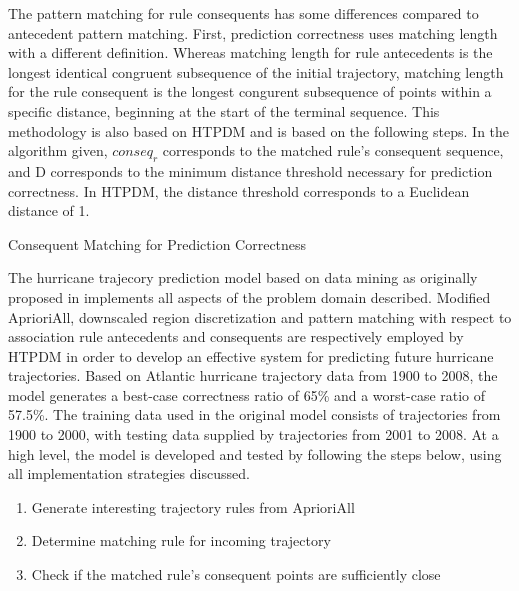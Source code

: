 \documentclass[12pt,conference]{IEEEtran}
\begin{document}
The pattern matching for rule consequents has some differences compared to antecedent pattern matching. First, prediction correctness uses matching length with a different definition. Whereas matching length for rule antecedents is the longest identical congruent subsequence of the initial trajectory, matching length for the rule consequent is the longest congurent subsequence of points within a specific distance, beginning at the start of the terminal sequence. This methodology is also based on HTPDM and is based on the following steps. In the algorithm given, $conseq_{r}$ corresponds to the matched rule's consequent sequence, and D corresponds to the minimum distance threshold necessary for prediction correctness. In HTPDM, the distance threshold corresponds to a Euclidean distance of 1.

\begin{algorithm}[H]
  \caption{Consequent Matching for Prediction Correctness}
  \label{consequent_matching}
  \begin{algorithmic}[1]
  \EndIf
  \end{algorithmic}
\end{algorithm}

The hurricane trajecory prediction model based on data mining as originally proposed in \cite{major-hurricane-model} implements all aspects of the problem domain described. Modified AprioriAll, downscaled region discretization and pattern matching with respect to association rule antecedents and consequents are respectively employed by HTPDM in order to develop an effective system for predicting future hurricane trajectories. Based on Atlantic hurricane trajectory data from 1900 to 2008, the model generates a best-case correctness ratio of 65\% and a worst-case ratio of 57.5\%. The training data used in the original model consists of trajectories from 1900 to 2000, with testing data supplied by trajectories from 2001 to 2008. At a high level, the model is developed and tested by following the steps below, using all implementation strategies discussed. 


\begin{enumerate}
\item Generate interesting trajectory rules from AprioriAll
\item Determine matching rule for incoming trajectory 
\item Check if the matched rule's consequent points are sufficiently close
\end{enumerate}
\end{document}
